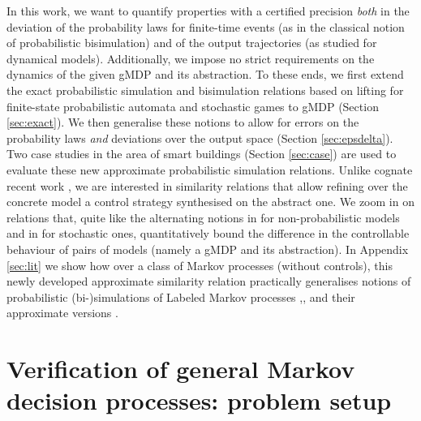 \documentclass[letterpaper, 10 pt, conference]{amsart}
\theoremstyle{definition}
\theoremstyle{example}
\theoremstyle{remark}
\begin{document}
In this work,   
we want to quantify properties with a certified precision \emph{both} in the deviation of the probability laws for finite-time events (as in the classical notion of probabilistic bisimulation) and of the output trajectories (as studied for dynamical models).  
Additionally, we impose no strict requirements on the dynamics of the given gMDP and its abstraction. 
To these ends, 
we first extend the exact probabilistic simulation and bisimulation relations based on lifting for finite-state probabilistic automata and stochastic games \cite{Segala1995,Segala1995a,Zhang2010a} to gMDP (Section \ref{sec:exact}).  
We then generalise these notions to allow for errors on the probability laws \emph{and} deviations over the output space (Section \ref{sec:epsdelta}). 
Two case studies in the area of smart buildings (Section \ref{sec:case}) are used to evaluate these new approximate probabilistic simulation relations. 
Unlike cognate recent work \cite{Abate2011,Julius2009a}, 
we are interested in similarity relations that allow refining over the concrete model a control strategy synthesised on the abstract one. 
We zoom in on relations that, quite like the alternating notions in \cite{Alur1998,Tabuada2009b} for non-probabilistic models and in \cite{Zhang2010a} for stochastic ones, 
quantitatively bound the difference in the controllable behaviour of pairs of models (namely a gMDP and its abstraction).  
In Appendix \ref{sec:lit} we show how over a class 
of Markov processes (without controls), 
this newly developed approximate similarity relation practically generalises notions of probabilistic \mbox{(bi-)simulations} of Labeled Markov processes \cite[based on zigzag-morphisms]{Desharnais2002},\cite[based on equivalence relations]{Desharnais2003}, and  
 their  approximate versions \cite[based on binary relations]{desharnais2004metrics,Desharnais2008,cDAK12}. 
 

\section{Verification of general Markov decision processes: problem setup}  
\end{document}
